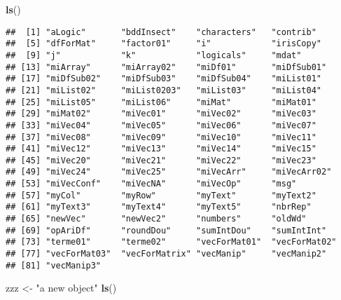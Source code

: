 \documentclass[]{book}
\newenvironment{Shaded}{\begin{snugshade}}{\end{snugshade}}
\newcommand{\KeywordTok}[1]{\textcolor[rgb]{0.13,0.29,0.53}{\textbf{#1}}}
\newcommand{\StringTok}[1]{\textcolor[rgb]{0.31,0.60,0.02}{#1}}
\newcommand{\NormalTok}[1]{#1}
\theoremstyle{definition}
\theoremstyle{definition}
\theoremstyle{definition}
\theoremstyle{remark}
\begin{document}
\begin{Shaded}
\begin{Highlighting}[]
\KeywordTok{ls}\NormalTok{()}
\end{Highlighting}
\end{Shaded}

\begin{verbatim}
##  [1] "aLogic"       "bddInsect"    "characters"   "contrib"     
##  [5] "dfForMat"     "factor01"     "i"            "irisCopy"    
##  [9] "j"            "k"            "logicals"     "mdat"        
## [13] "miArray"      "miArray02"    "miDf01"       "miDfSub01"   
## [17] "miDfSub02"    "miDfSub03"    "miDfSub04"    "miList01"    
## [21] "miList02"     "miList0203"   "miList03"     "miList04"    
## [25] "miList05"     "miList06"     "miMat"        "miMat01"     
## [29] "miMat02"      "miVec01"      "miVec02"      "miVec03"     
## [33] "miVec04"      "miVec05"      "miVec06"      "miVec07"     
## [37] "miVec08"      "miVec09"      "miVec10"      "miVec11"     
## [41] "miVec12"      "miVec13"      "miVec14"      "miVec15"     
## [45] "miVec20"      "miVec21"      "miVec22"      "miVec23"     
## [49] "miVec24"      "miVec25"      "miVecArr"     "miVecArr02"  
## [53] "miVecConf"    "miVecNA"      "miVecOp"      "msg"         
## [57] "myCol"        "myRow"        "myText"       "myText2"     
## [61] "myText3"      "myText4"      "myText5"      "nbrRep"      
## [65] "newVec"       "newVec2"      "numbers"      "oldWd"       
## [69] "opAriDf"      "roundDou"     "sumIntDou"    "sumIntInt"   
## [73] "terme01"      "terme02"      "vecForMat01"  "vecForMat02" 
## [77] "vecForMat03"  "vecForMatrix" "vecManip"     "vecManip2"   
## [81] "vecManip3"
\end{verbatim}

\begin{Shaded}
\begin{Highlighting}[]
\NormalTok{zzz <-}\StringTok{ "a new object"}
\KeywordTok{ls}\NormalTok{()}
\end{Highlighting}
\end{Shaded}
\end{document}
